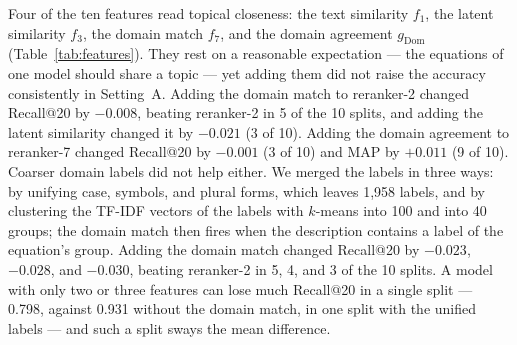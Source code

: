 Four of the ten features read topical closeness: the text similarity $f_1$, the latent similarity
$f_3$, the domain match $f_7$, and the domain agreement $g_{\mathrm{Dom}}$
(Table~\ref{tab:features}). They rest on a reasonable expectation --- the equations of one model
should share a topic --- yet adding them did not raise the accuracy consistently in Setting~A.
Adding the domain match to reranker-2 changed Recall@20 by $-0.008$, beating reranker-2 in 5 of the
10 splits, and adding the latent similarity changed it by $-0.021$ (3 of 10). Adding the domain
agreement to reranker-7 changed Recall@20 by $-0.001$ (3 of 10) and MAP by $+0.011$ (9 of 10).
Coarser domain labels did not help either. We merged the labels in three ways: by unifying case,
symbols, and plural forms, which leaves 1,958 labels, and by clustering the TF-IDF vectors of the
labels with $k$-means into 100 and into 40 groups; the domain match then fires when the
description contains a label of the equation's group. Adding the domain match changed Recall@20 by
$-0.023$, $-0.028$, and $-0.030$, beating reranker-2 in 5, 4, and 3 of the 10 splits. A model with
only two or three features can lose much Recall@20 in a single split --- 0.798, against 0.931
without the domain match, in one split with the unified labels --- and such a split sways the mean
difference.

